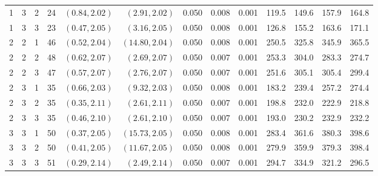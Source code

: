 \documentclass{article}
\numberwithin{equation}{section}
\theoremstyle{plain}
\begin{document}
\begin{sidewaystable}[htbp]
\begin{center}
\begin{tabular}{rrrrrrrrrrrrr}
			1 & 3 & 2 & 24 & $(0.84, 2.02)$ & $(2.91, 2.02)$ & 0.050 & 0.008 & 0.001 & 119.5 & 149.6 & 157.9 & 164.8 \\
			1 & 3 & 3 & 23 & $(0.47, 2.05)$ & $(3.16, 2.05)$ & 0.050 & 0.008 & 0.001 & 126.8 & 155.2 & 163.6 & 171.1 \\
			2 & 2 & 1 & 46 & $(0.52, 2.04)$ & $(14.80, 2.04)$ & 0.050 & 0.008 & 0.001 & 250.5 & 325.8 & 345.9 & 365.5 \\
			2 & 2 & 2 & 48 & $(0.62, 2.07)$ & $(2.69, 2.07)$ & 0.050 & 0.007 & 0.001 & 253.3 & 304.0 & 283.3 & 274.7 \\
			2 & 2 & 3 & 47 & $(0.57, 2.07)$ & $(2.76, 2.07)$ & 0.050 & 0.007 & 0.001 & 251.6 & 305.1 & 305.4 & 299.4 \\
			2 & 3 & 1 & 35 & $(0.66, 2.03)$ & $(9.32, 2.03)$ & 0.050 & 0.008 & 0.001 & 183.2 & 239.4 & 257.2 & 274.4 \\
			2 & 3 & 2 & 35 & $(0.35, 2.11)$ & $(2.61, 2.11)$ & 0.050 & 0.007 & 0.001 & 198.8 & 232.0 & 222.9 & 218.8 \\
			2 & 3 & 3 & 35 & $(0.46, 2.10)$ & $(2.61, 2.10)$ & 0.050 & 0.007 & 0.001 & 193.0 & 230.2 & 232.9 & 232.2 \\
			3 & 3 & 1 & 50 & $(0.37, 2.05)$ & $(15.73, 2.05)$ & 0.050 & 0.008 & 0.001 & 283.4 & 361.6 & 380.3 & 398.6 \\
			3 & 3 & 2 & 50 & $(0.41, 2.05)$ & $(11.67, 2.05)$ & 0.050 & 0.008 & 0.001 & 279.9 & 359.9 & 379.3 & 398.4 \\
			3 & 3 & 3 & 51 & $(0.29, 2.14)$ & $(2.49, 2.14)$ & 0.050 & 0.007 & 0.001 & 294.7 & 334.9 & 321.2 & 296.5 \\
			\hline
		\end{tabular}
	\end{center}
\end{sidewaystable}
\end{document}
